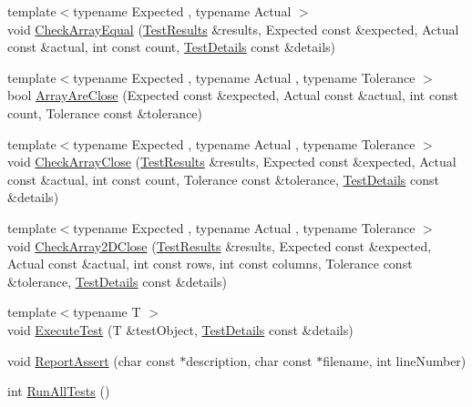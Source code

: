 \begin{CompactItemize}
\item 
{\footnotesize template$<$typename Expected , typename Actual $>$ }\\void \hyperlink{namespace_unit_test_dc09d2b88bb76b95ad22c8ddad4a3b2e}{CheckArrayEqual} (\hyperlink{class_unit_test_1_1_test_results}{TestResults} \&results, Expected const \&expected, Actual const \&actual, int const count, \hyperlink{class_unit_test_1_1_test_details}{TestDetails} const \&details)
\item 
{\footnotesize template$<$typename Expected , typename Actual , typename Tolerance $>$ }\\bool \hyperlink{namespace_unit_test_85e7f57e6cfff23ff830301a81d6f09f}{ArrayAreClose} (Expected const \&expected, Actual const \&actual, int const count, Tolerance const \&tolerance)
\item 
{\footnotesize template$<$typename Expected , typename Actual , typename Tolerance $>$ }\\void \hyperlink{namespace_unit_test_695643a3df5c6f3cb60d428dcda22fcb}{CheckArrayClose} (\hyperlink{class_unit_test_1_1_test_results}{TestResults} \&results, Expected const \&expected, Actual const \&actual, int const count, Tolerance const \&tolerance, \hyperlink{class_unit_test_1_1_test_details}{TestDetails} const \&details)
\item 
{\footnotesize template$<$typename Expected , typename Actual , typename Tolerance $>$ }\\void \hyperlink{namespace_unit_test_1e2cb7cf282dcd896cc2c3810576fd8b}{CheckArray2DClose} (\hyperlink{class_unit_test_1_1_test_results}{TestResults} \&results, Expected const \&expected, Actual const \&actual, int const rows, int const columns, Tolerance const \&tolerance, \hyperlink{class_unit_test_1_1_test_details}{TestDetails} const \&details)
\item 
{\footnotesize template$<$typename T $>$ }\\void \hyperlink{namespace_unit_test_ef3cc9905021eb7ee6909a1bfd156bc5}{ExecuteTest} (T \&testObject, \hyperlink{class_unit_test_1_1_test_details}{TestDetails} const \&details)
\item 
void \hyperlink{namespace_unit_test_891668df864d7e73585fa7699398ee07}{ReportAssert} (char const $\ast$description, char const $\ast$filename, int lineNumber)
\item 
int \hyperlink{namespace_unit_test_00270e02336149dfb00bf0374587521c}{RunAllTests} ()
\end{CompactItemize}


